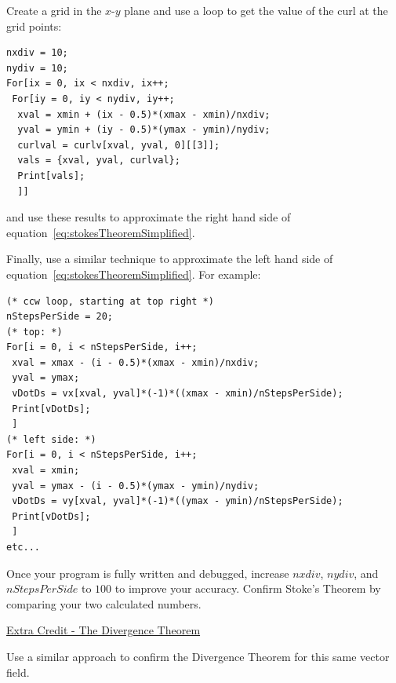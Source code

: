 Create a grid in the $x$-$y$ plane and use a loop to get the value of the curl at the grid points:
\begin{verbatim}
nxdiv = 10;
nydiv = 10;
For[ix = 0, ix < nxdiv, ix++;
 For[iy = 0, iy < nydiv, iy++;
  xval = xmin + (ix - 0.5)*(xmax - xmin)/nxdiv;
  yval = ymin + (iy - 0.5)*(ymax - ymin)/nydiv;
  curlval = curlv[xval, yval, 0][[3]];
  vals = {xval, yval, curlval};
  Print[vals];
  ]] 
\end{verbatim}
and use these results to approximate the right hand side of equation~\ref{eq:stokesTheoremSimplified}.

Finally, use a similar technique to approximate the left hand side of equation~\ref{eq:stokesTheoremSimplified}.
For example:
\begin{verbatim}
(* ccw loop, starting at top right *)
nStepsPerSide = 20;
(* top: *)
For[i = 0, i < nStepsPerSide, i++;
 xval = xmax - (i - 0.5)*(xmax - xmin)/nxdiv;
 yval = ymax;
 vDotDs = vx[xval, yval]*(-1)*((xmax - xmin)/nStepsPerSide);
 Print[vDotDs];
 ]
(* left side: *)
For[i = 0, i < nStepsPerSide, i++;
 xval = xmin;
 yval = ymax - (i - 0.5)*(ymax - ymin)/nydiv;
 vDotDs = vy[xval, yval]*(-1)*((ymax - ymin)/nStepsPerSide);
 Print[vDotDs];
 ]
etc...
\end{verbatim}
Once your program is fully written and debugged, increase $nxdiv$, $nydiv$, and $nStepsPerSide$ to $100$ to improve your accuracy.
Confirm Stoke's Theorem by comparing your two calculated numbers.


\hfill \break
\underline{Extra Credit - The Divergence Theorem}
\hfill \break

Use a similar approach to confirm the Divergence Theorem for this same vector field.

\pagebreak \clearpage
